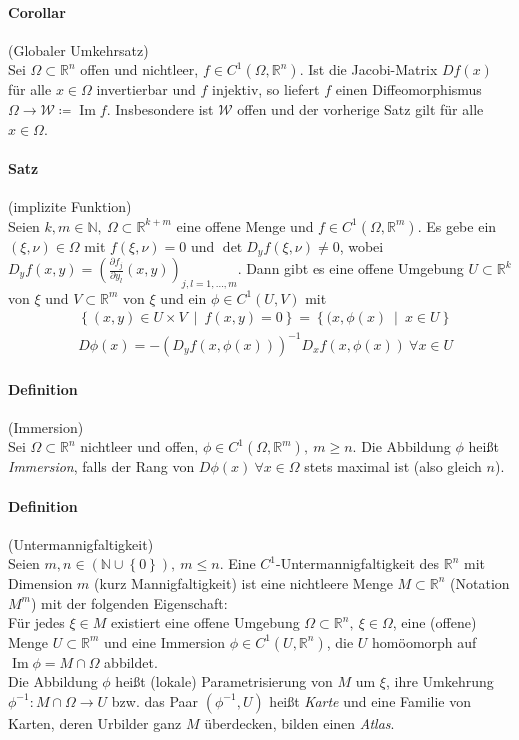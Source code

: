 \documentclass[12pt,a4paper,fleqn]{article}
\DeclareMathOperator{\im}{Im}
\def\set#1{{\left\{ #1 \right\}}}
\def\Mid{\ \middle|\ }
\def\R{{\mathbb{R}}}
\begin{document}
\paragraph{Corollar} (Globaler Umkehrsatz)\\
Sei $\Omega \subset \R^n$ offen und nichtleer, $f \in C^1 (\Omega, \R^n)$. Ist die Jacobi-Matrix $Df(x)$ für alle $x \in \Omega$ invertierbar und $f$ injektiv, so liefert $f$ einen Diffeomorphismus $\Omega \rightarrow \mathcal{W} \coloneqq \im f$. Insbesondere ist $\mathcal{W}$ offen und der vorherige Satz gilt für alle $x \in \Omega$.

\paragraph{Satz} (implizite Funktion)\\
Seien $k, m \in \mathbb{N},\ \Omega \subset \R^{k+m}$ eine offene Menge und $f \in C^1(\Omega, \R^m)$. Es gebe ein \mbox{$(\xi, \nu) \in \Omega$} mit $f(\xi, \nu) = 0$ und $\det D_yf(\xi, \nu) \not = 0$, wobei $D_yf(x, y) = \left(\frac{\partial f_j}{\partial y_l}(x, y)\right)_{j, l = 1, \dots, m}$. Dann gibt es eine offene Umgebung $U \subset \R^k$ von $\xi$ und $V \subset \R^m$ von $\xi$ und ein $\phi \in C^1(U, V)$ mit 
\begin{align*}
&\set{(x, y) \in U \times V \Mid f(x, y) = 0} = \set{(x, \phi(x) \Mid x \in U}\\
&D\phi(x) = -(D_yf(x, \phi(x)))^{-1} D_xf(x, \phi(x))\ \forall x \in U
\end{align*}

\paragraph{Definition} (Immersion)\\
Sei $\Omega \subset \R^n$ nichtleer und offen, $\phi \in C^1(\Omega, \R^m),\ m \geq n$. Die Abbildung $\phi$ heißt \textit{Immersion}, falls der Rang von $D\phi(x)\ \forall x \in \Omega$ stets maximal ist (also gleich $n$).

\paragraph{Definition} (Untermannigfaltigkeit)\\
Seien $m, n \in (\mathbb{N} \cup \set{0}),\ m \leq n$. Eine $C^1$-Untermannigfaltigkeit des $\R^n$ mit Dimension $m$ (kurz Mannigfaltigkeit) ist eine nichtleere Menge $M \subset \R^n$ (Notation $M^m$) mit der folgenden Eigenschaft:\\
Für jedes $\xi \in M$ existiert eine offene Umgebung $\Omega \subset \R^n,\ \xi \in \Omega$, eine (offene) Menge $U \subset \R^m$ und eine Immersion $\phi \in C^1(U, \R^n)$, die $U$ homöomorph auf $\im \phi  = M \cap \Omega$ abbildet.\\
Die Abbildung $\phi$ heißt (lokale) Parametrisierung von $M$ um $\xi$, ihre Umkehrung $\phi^{-1}\colon M \cap \Omega \rightarrow U$ bzw. das Paar $(\phi^{-1}, U)$ heißt \textit{Karte} und eine Familie von Karten, deren Urbilder ganz $M$ überdecken, bilden einen \textit{Atlas}.
\end{document}
